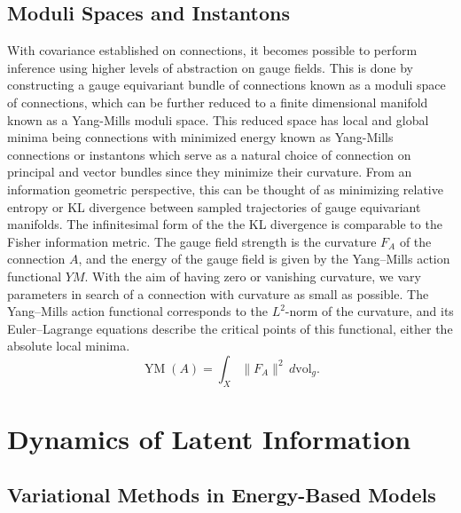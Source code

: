 \documentclass{article}
\begin{document}
\subsection{Moduli Spaces and Instantons}
    With covariance established on connections, it becomes possible to perform inference using higher levels of abstraction on gauge fields. This is done by constructing a gauge equivariant bundle of connections known as a moduli space of connections, which can be further reduced to a finite dimensional manifold known as a Yang-Mills moduli space. This reduced space has local and global minima being connections with minimized energy known as Yang-Mills connections or instantons which serve as a natural choice of connection on principal and vector bundles since they minimize their curvature. From an information geometric perspective, this can be thought of as minimizing relative entropy or KL divergence between sampled trajectories of gauge equivariant manifolds. The infinitesimal form of the the KL divergence is comparable to the Fisher information metric. The gauge field strength is the curvature $F_{A}$ of the connection $A$, and the energy of the gauge field is given by the Yang–Mills action functional $YM$. With the aim of having zero or vanishing curvature, we vary parameters in search of a connection with curvature as small as possible. The Yang–Mills action functional corresponds to the $L^{2}$-norm of the curvature, and its Euler–Lagrange equations describe the critical points of this functional, either the absolute  local minima.   
    \begin{equation}
         {\displaystyle \operatorname {YM} (A)=\int _{X}\|F_{A}\|^{2}\,d\mathrm {vol} _{g}.}
    \end{equation}
    
    
\section{Dynamics of Latent Information}

\subsection{Variational Methods in Energy-Based Models}
    
\end{document}
